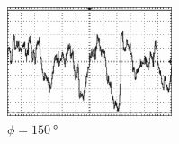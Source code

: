 	\hfill
	\begin{subfigure}{0.3\textwidth}
		\centering
		\includegraphics[height=3.21cm]{content/with_noise/150_with_noise.png}
		\caption{$\phi = \qty{150}{\degree}$}
	\end{subfigure}

